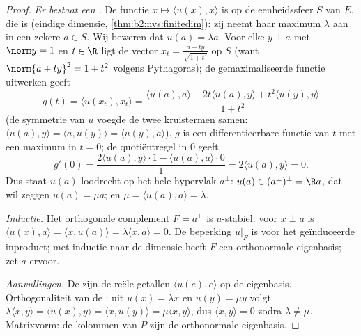 \begin{proof}
\emph{Er bestaat een .} De functie $x \mapsto \langle
u(x), x\rangle$ is  op de eenheidssfeer $S$ van $E$, die
 is (eindige dimensie, \cref{thm:b2:nvs:finitedim}): zij
neemt haar maximum $\lambda$ aan in een zekere $a \in S$. Wij
beweren dat $u(a) = \lambda a$. Voor elke $y \perp a$ met $\norm y
= 1$ en $t \in \R$ ligt de vector $x_t = \frac{a + ty}{\sqrt{1 +
t^2}}$ op $S$ (want $\norm{a + ty}^2 = 1 + t^2$ volgens Pythagoras);
de gemaximaliseerde functie uitwerken geeft
\[
g(t) = \langle u(x_t), x_t\rangle
= \frac{\langle u(a), a\rangle + 2t\langle u(a), y\rangle +
t^2\langle u(y), y\rangle}{1 + t^2}
\]
(de symmetrie van $u$ voegde de twee kruistermen samen: $\langle
u(a), y\rangle = \langle a, u(y)\rangle = \langle u(y), a\rangle$).
$g$ is een differentieerbare functie van $t$ met een maximum in $t
= 0$; de quotiëntregel in $0$ geeft
\[
g'(0) = \frac{2\langle u(a), y\rangle\cdot 1 - \langle u(a),
a\rangle\cdot 0}{1} = 2\langle u(a), y\rangle = 0 .
\]
Dus staat $u(a)$ loodrecht op het hele hypervlak $a^\perp$: $u(a)
\in (a^{\perp})^{\perp} = \R a$, dat wil zeggen $u(a) = \mu a$; en
$\mu = \langle u(a), a\rangle = \lambda$.

\emph{Inductie.} Het orthogonale complement $F = a^\perp$ is
$u$-stabiel: voor $x \perp a$ is $\langle u(x), a\rangle = \langle
x, u(a)\rangle = \lambda\langle x, a\rangle = 0$. De beperking
$u|_F$ is  voor het geïnduceerde inproduct; met
inductie naar de dimensie heeft $F$ een orthonormale eigenbasis;
zet $a$ ervoor.

\emph{Aanvullingen.} De  zijn de reële getallen
$\langle u(e), e\rangle$ op de eigenbasis. Orthogonaliteit van de
: uit $u(x) = \lambda x$ en $u(y) = \mu y$ volgt
$\lambda\langle x, y\rangle = \langle u(x), y\rangle = \langle x,
u(y)\rangle = \mu\langle x, y\rangle$, dus $\langle x, y\rangle =
0$ zodra $\lambda \neq \mu$. Matrixvorm: de kolommen van $P$ zijn
de orthonormale eigenbasis.
\end{proof}

